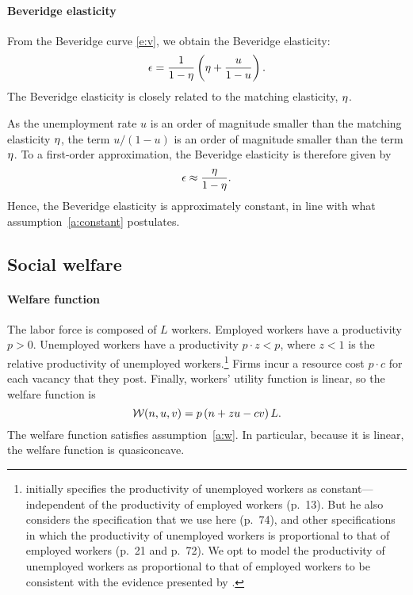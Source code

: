 \documentclass[letterpaper,12pt,leqno]{article}
\begin{document}
\paragraph{Beveridge elasticity} From the Beveridge curve \eqref{e:v}, we obtain the Beveridge elasticity:
\begin{equation}
\epsilon = \frac{1}{1-\eta}\left( \eta+\frac{u}{1-u} \right).
\label{e:edmp}\end{equation}
The Beveridge elasticity is closely related to the matching elasticity, $\eta$.

As the unemployment rate $u$ is an order of magnitude smaller than the matching elasticity $\eta$, the term $u/(1-u)$ is an order of magnitude smaller than the term $\eta$. To a first-order approximation, the Beveridge elasticity is therefore given by
\begin{equation}
\epsilon \approx \frac{\eta}{1-\eta}.
\label{e:eapprox}\end{equation}
Hence, the Beveridge elasticity is approximately constant, in line with what assumption~\ref{a:constant} postulates.  

\subsection{Social welfare}

\paragraph{Welfare function} The labor force is composed of $L$ workers. Employed workers have a productivity $p>0$. Unemployed workers have a productivity $p\cdot z <p$, where $z < 1$ is the relative productivity of unemployed workers.\footnote{ initially specifies the productivity of unemployed workers as constant---independent of the productivity of employed workers (p.~13). But he also considers the specification that we use here (p.~74), and other specifications in which the productivity of unemployed workers is proportional to that of employed workers (p.~21 and p.~72). We opt to model the productivity of unemployed workers as proportional to that of employed workers to be consistent with the evidence presented by .} Firms incur a resource cost $p\cdot c$ for each vacancy that they post. Finally, workers' utility function is linear, so the welfare function is
\begin{equation}
\mathcal{W}(n,u,v) = p \left( n  + z u - c v \right) L.
\label{e:w}\end{equation}
The welfare function satisfies assumption~\ref{a:w}. In particular, because it is linear, the welfare function is quasiconcave.
\end{document}
